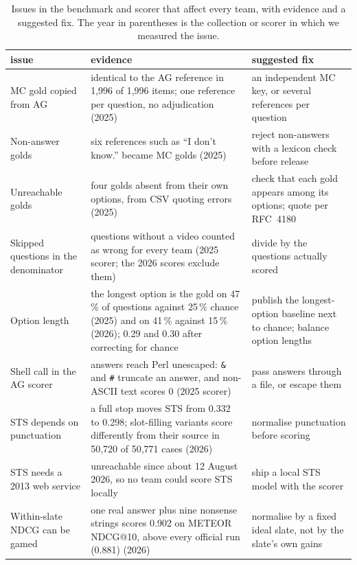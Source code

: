 \documentclass[sigconf,nonacm]{acmart}
\begin{document}
\begin{table}[t]
\caption{Issues in the benchmark and scorer that affect every team, with evidence
and a suggested fix. The year in parentheses is the collection or scorer in which
we measured the issue.}
\label{tab:organisers}
\small
\setlength{\tabcolsep}{4pt}
\begin{tabular}{>{\raggedright\arraybackslash}p{}>{\raggedright\arraybackslash}p{}>{\raggedright\arraybackslash}p{}}
\toprule
issue & evidence & suggested fix \\
\midrule
MC gold copied from AG & identical to the AG reference in 1,996 of 1,996 items; one reference per question, no adjudication (2025) & an independent MC key, or several references per question \\
Non-answer golds & six references such as ``I don't know.'' became MC golds (2025) & reject non-answers with a lexicon check before release \\
Unreachable golds & four golds absent from their own options, from CSV quoting errors (2025) & check that each gold appears among its options; quote per RFC~4180 \\
Skipped questions in the denominator & 18 questions without a video counted as wrong for every team (2025 scorer; the 2026 scores exclude them) & divide by the questions actually scored \\
Option length & the longest option is the gold on 47\,\% of questions against 25\,\% chance (2025) and on 41\,\% against 15\,\% (2026); 0.29 and 0.30 after correcting for chance & publish the longest-option baseline next to chance; balance option lengths \\
Shell call in the AG scorer & answers reach Perl unescaped: \texttt{\&} and \texttt{\#} truncate an answer, and non-ASCII text scores 0 (2025 scorer) & pass answers through a file, or escape them \\
STS depends on punctuation & a full stop moves STS from 0.332 to 0.298; slot-filling variants score differently from their source in 50,720 of 50,771 cases (2026) & normalise punctuation before scoring \\
STS needs a 2013 web service & unreachable since about 12 August 2026, so no team could score STS locally & ship a local STS model with the scorer \\
Within-slate NDCG can be gamed & one real answer plus nine nonsense strings scores 0.902 on METEOR NDCG@10, above every official run (0.881) (2026) & normalise by a fixed ideal slate, not by the slate's own gains \\
\bottomrule
\end{tabular}
\end{table}
\end{document}
